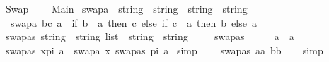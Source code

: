 %
\begin{isabellebody}%
%
%
\isadelimtheory
%
\endisadelimtheory
%
\isatagtheory
{}\isamarkupfalse%
\ Swap\ \isanewline
\ \ \ Main\isanewline
{}%
\endisatagtheory
{\isafoldtheory}%
%
\isadelimtheory
\isanewline
%
\endisadelimtheory
\isanewline
\isanewline
\isanewline
{}\isamarkupfalse%
\ swapa\ {\isacharcolon}{\kern0pt}{\isacharcolon}{\kern0pt}\ {\isachardoublequoteopen}{\isacharparenleft}{\kern0pt}string\ {\isasymtimes}\ string{\isacharparenright}{\kern0pt}\ {\isasymRightarrow}\ string\ {\isasymRightarrow}\ string{\isachardoublequoteclose}\isanewline
\ \ \isanewline
\ \ {\isachardoublequoteopen}swapa\ {\isacharparenleft}{\kern0pt}b{\isacharcomma}{\kern0pt}c{\isacharparenright}{\kern0pt}\ a\ {\isacharequal}{\kern0pt}\ {\isacharparenleft}{\kern0pt}if\ b\ {\isacharequal}{\kern0pt}\ a\ then\ c\ else\ {\isacharparenleft}{\kern0pt}if\ c\ {\isacharequal}{\kern0pt}\ a\ then\ b\ else\ a{\isacharparenright}{\kern0pt}{\isacharparenright}{\kern0pt}{\isachardoublequoteclose}\isanewline
\isanewline
{}\isamarkupfalse%
\ swapas{\isacharcolon}{\kern0pt}{\isacharcolon}{\kern0pt}\ {\isachardoublequoteopen}{\isacharparenleft}{\kern0pt}string\ {\isasymtimes}\ string{\isacharparenright}{\kern0pt}\ list\ {\isasymRightarrow}\ string\ {\isasymRightarrow}\ string{\isachardoublequoteclose}\isanewline
\ \ \isanewline
\ \ {\isachardoublequoteopen}swapas\ {\isacharbrackleft}{\kern0pt}{\isacharbrackright}{\kern0pt}\ \ \ \ \ a\ {\isacharequal}{\kern0pt}\ a{\isachardoublequoteclose}\isanewline
{\isacharbar}{\kern0pt}\ {\isachardoublequoteopen}swapas\ {\isacharparenleft}{\kern0pt}x{\isacharhash}{\kern0pt}pi{\isacharparenright}{\kern0pt}\ a\ {\isacharequal}{\kern0pt}\ swapa\ x\ {\isacharparenleft}{\kern0pt}swapas\ pi\ a{\isacharparenright}{\kern0pt}{\isachardoublequoteclose}\isanewline
\isanewline
{}\isamarkupfalse%
\ {\isacharbrackleft}{\kern0pt}simp{\isacharbrackright}{\kern0pt}{\isacharcolon}{\kern0pt}\ \isanewline
\ \ \ {\isachardoublequoteopen}swapas\ {\isacharbrackleft}{\kern0pt}{\isacharparenleft}{\kern0pt}a{\isacharcomma}{\kern0pt}a{\isacharparenright}{\kern0pt}{\isacharbrackright}{\kern0pt}\ b{\isacharequal}{\kern0pt}b{\isachardoublequoteclose}\isanewline
%
\isadelimproof
\ \ %
\endisadelimproof
%
\isatagproof
{}\isamarkupfalse%
\ simp%
\endisatagproof
{\isafoldproof}%
%
\isadelimproof
\isanewline
%
\endisadelimproof
\isanewline
{}\isamarkupfalse%

\end{isabellebody}
